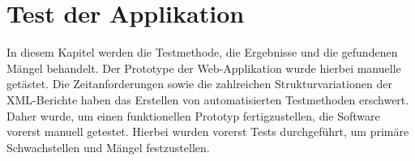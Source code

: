 \newpage
\section{Test der Applikation}
\label{sec:integration-und-test}


In diesem Kapitel werden die Testmethode, die Ergebnisse und die gefundenen Mängel behandelt.
Der Prototype der Web-Applikation wurde hierbei manuelle getästet.
Die Zeitanforderungen sowie die zahlreichen Strukturvariationen der XML-Berichte haben das Erstellen von automatisierten Testmethoden erschwert.
Daher wurde, um einen funktionellen Prototyp fertigzustellen, die Software vorerst manuell getestet.
Hierbei wurden vorerst Tests durchgeführt, um primäre Schwachstellen und Mängel festzustellen.



